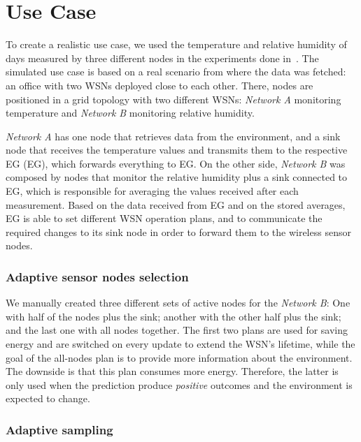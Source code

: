 \documentclass{llncs}
\newcommand{\EG}[1]{EG}
\begin{document}
\section{Use Case}
\label{sec:current-simulations-scenario}

To create a realistic use case, we used the temperature and relative humidity 
of  days measured by three different nodes in the experiments done 
in~\cite{Yann-Ael2005}. 
The simulated use case is based on a real scenario from where the data was 
fetched: an office with two WSNs deployed close to each other. 
There, nodes are positioned in a grid topology with two different WSNs: 
\emph{Network A} monitoring temperature and \emph{Network B} monitoring 
relative humidity.

\emph{Network A} has one node that retrieves data from the environment, and a 
sink node that receives the temperature values and transmits them to the 
respective EG (\EG{A}), which forwards everything to \EG{B}. On the other side, 
\emph{Network B} was composed by  nodes that monitor the relative humidity 
plus a sink connected to \EG{B}, which is responsible for averaging the values 
received after each measurement. Based on the data received from \EG{A} and on 
the stored averages, \EG{B} is able to set different WSN operation plans, and to 
communicate the required changes to its sink node in order to forward them to 
the wireless sensor nodes.

\subsubsection{Adaptive sensor nodes selection}

We manually created three different sets of active nodes for the \emph{Network 
B}: One with half of the nodes plus the sink; another with the other half plus 
the sink; and the last one with all nodes together. The first two plans are 
used for saving energy and are switched on every update to extend the WSN's 
lifetime, while the goal of the all-nodes plan is to provide more information 
about the environment. The downside is that this plan consumes more energy. 
Therefore, the latter is only used when the prediction produce 
\emph{positive} outcomes and the environment is expected to change. 

\subsubsection{Adaptive sampling}
\end{document}
